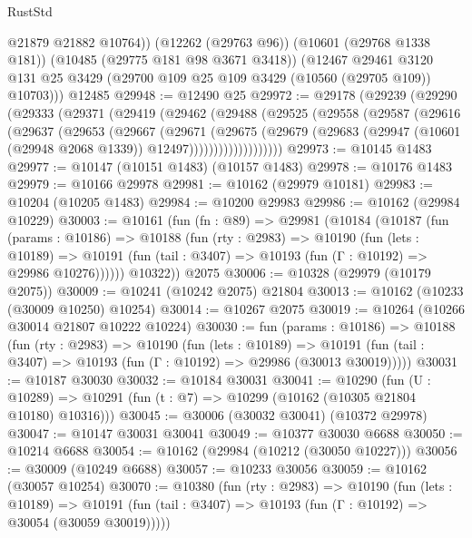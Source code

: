 \begin{lexlean}{RustStd}
\begin{coremodule}
          @21879
          @21882
          @10764))
      (@12262 (@29763 @96))
      (@10601 (@29768 @1338 @181))
      (@10485 (@29775 @181 @98 @3671 @3418))
      (@12467
        @29461
        @3120
        @131
        @25
        @3429
        (@29700 @109 @25 @109 @3429 (@10560 (@29705 @109)) @10703)))
    @12485
@29948 := @12490 @25
@29972 := @29178
    (@29239
      (@29290
        (@29333
          (@29371
            (@29419
              (@29462
                (@29488
                  (@29525
                    (@29558
                      (@29587
                        (@29616
                          (@29637
                            (@29653
                              (@29667
                                (@29671
                                  (@29675
                                    (@29679
                                      (@29683
                                        (@29947
                                          (@10601 (@29948 @2068 @1339))
                                          @12497)))))))))))))))))))
@29973 := @10145 @1483
@29977 := @10147 (@10151 @1483) (@10157 @1483)
@29978 := @10176 @1483
@29979 := @10166 @29978
@29981 := @10162 (@29979 @10181)
@29983 := @10204 (@10205 @1483)
@29984 := @10200 @29983
@29986 := @10162 (@29984 @10229)
@30003 := @10161
    (fun (fn : @89) =>
    @29981
      (@10184
        (@10187
          (fun (params : @10186) =>
          @10188
            (fun (rty : @2983) =>
            @10190
              (fun (lets : @10189) =>
              @10191 (fun (tail : @3407) => @10193 (fun (Γ : @10192) => @29986 @10276))))))
        @10322))
    @2075
@30006 := @10328 (@29979 (@10179 @2075))
@30009 := @10241 (@10242 @2075) @21804
@30013 := @10162 (@10233 (@30009 @10250) @10254)
@30014 := @10267 @2075
@30019 := @10264 (@10266 @30014 @21807 @10222 @10224)
@30030 := fun (params : @10186) =>
  @10188
    (fun (rty : @2983) =>
    @10190
      (fun (lets : @10189) =>
      @10191 (fun (tail : @3407) => @10193 (fun (Γ : @10192) => @29986 (@30013 @30019)))))
@30031 := @10187 @30030
@30032 := @10184 @30031
@30041 := @10290
    (fun (U : @10289) => @10291 (fun (t : @7) => @10299 (@10162 (@10305 @21804 @10180) @10316)))
@30045 := @30006 (@30032 @30041) (@10372 @29978)
@30047 := @10147 @30031 @30041
@30049 := @10377 @30030 @6688
@30050 := @10214 @6688
@30054 := @10162 (@29984 (@10212 (@30050 @10227)))
@30056 := @30009 (@10249 @6688)
@30057 := @10233 @30056
@30059 := @10162 (@30057 @10254)
@30070 := @10380
    (fun (rty : @2983) =>
    @10190
      (fun (lets : @10189) =>
      @10191 (fun (tail : @3407) => @10193 (fun (Γ : @10192) => @30054 (@30059 @30019)))))

\end{coremodule}
\end{lexlean}
